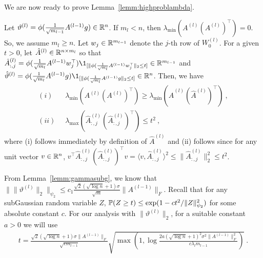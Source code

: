We are now ready to prove Lemma~\ref{lemm:highproblambda}.
%

 Let $\vartheta^{(l)} = \phi(\frac{1}{\sqrt{m_{l-1}}} A^{(l-1)} g) \in \R^{n}$. If $m_l < n$, then $\lambda_{\min}(A^{(l)} (A^{(l)})^\top) = 0$. So, we assume $m_l \geq n$.
%
Let $w_j \in \R^{m_{l-1}}$ denote the $j$-th row of $W_0^{(l)}$.
For a given $t>0$, let $\hat{A}^{(l)} \in \R^{n \times m_l}$ so that $\hat{A}_{:,j}^{(l)} = \phi( \frac{1}{\sqrt{m_l}} A^{(l-1)} w_j^\top ) \1_{[\| \phi(\frac{1}{\sqrt{m_l}} A^{(l-1)} w_j^\top \|_2 \leq t]}\in\R^{m_{l-1}}$ and $\hat{\vartheta}^{(l)} = \phi( \frac{1}{\sqrt{m_l}} A^{(l-1)} g ) \1_{[\| \phi(\frac{1}{\sqrt{m_l}} A^{(l-1)} g \|_2 \leq t]} \in \R^n$. Then, we have 
\begin{align*}
(i)\;\; &
\lambda_{\min}( A^{(l)} ( A^{(l)})^\top ) \geq \lambda_{\min}( \hat{A}^{(l)} ( \hat{A}^{(l)})^\top )  ~,\\
(ii)\;\;&\lambda_{\max}( \hat{A}_{:,j}^{(l)} ( \hat{A}_{:,j}^{(l)})^\top ) \leq t^2~,
\end{align*}
where (i) follows immediately by definition of $\hat{A}^{(l)}$ and (ii) follows since for any unit vector $v \in \R^n$, 
$v^\top \hat{A}_{:,j}^{(l)} ( \hat{A}_{:,j}^{(l)})^\top v = \langle v, \hat{A}_{:,j}^{(l)} \rangle^2 \leq \| \hat{A}_{:,j}^{(l)} \|_2^2 \leq t^2$.

From Lemma~\ref{lemm:gammasubg}, we know that $\| \| \vartheta^{(l)} \|_2 \|_{\psi_2} \leq c_1  \frac{\sqrt{2}(\sqrt{\log n}+1)\sigma}{\sqrt{m}} \| A^{(l-1)} \|_F$.  Recall that for any subGaussian random variable $Z$, $\P(Z \geq t) \leq \exp(1-c t^2/\| Z \|_{\psi_2}^2)$ for some absolute constant $c$. For our analysis with $\| \vartheta^{(l)} \|_2$, for a suitable constant $a > 0$ we will use 
\begin{align}
    t = \frac{  \sqrt{2} (\sqrt{\log n}+1) \sigma \| A^{(l-1)} \|_F}{\sqrt{cm_{l-1}}} \sqrt{ \max \left(1 , \log \frac{2a (\sqrt{\log n} + 1)^2 \sigma^2 \| A^{(l-1)} \|_F^2}{ c \lambda_l m_{l-1}} \right) }~.
\label{eq:thres}
\end{align}

